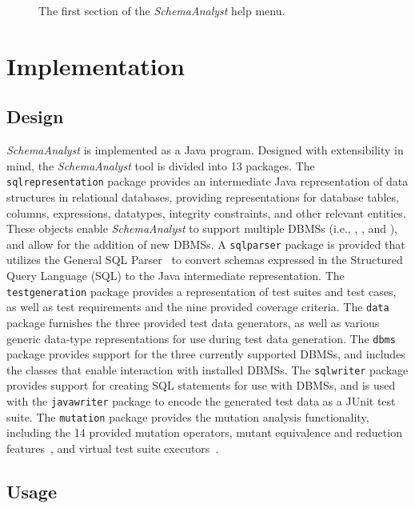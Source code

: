 \begin{figure}

\caption{\label{fig:usage} The first section of the \textit{SchemaAnalyst} help menu.}
\end{figure}

\section{Implementation}\label{sec:implementation}
\subsection{Design}


\textit{SchemaAnalyst} is implemented as a Java program.  Designed with extensibility in mind, the
\textit{SchemaAnalyst} tool is divided into 13 packages. The \texttt{sqlrepresentation} package provides an intermediate
Java representation of data structures in relational databases, providing representations for database tables, columns,
expressions, datatypes, integrity constraints, and other relevant entities. These objects enable \textit{SchemaAnalyst}
to support multiple DBMSs (i.e., \sqlite, \postgres, and \hypersql), and allow for the addition of new DBMSs. A
\texttt{sqlparser} package is provided that utilizes the General SQL Parser~\cite{} to convert schemas expressed in the
Structured Query Language (SQL) to the Java intermediate representation. The \texttt{testgeneration} package provides a
representation of test suites and test cases, as well as test requirements and the nine provided coverage criteria. The
\texttt{data} package furnishes the three provided test data generators, as well as various generic data-type
representations for use during test data generation. The \texttt{dbms} package provides support for the three currently
supported DBMSs, and includes the classes that enable interaction with installed DBMSs. The \texttt{sqlwriter} package
provides support for creating SQL statements for use with DBMSs, and is used with the \texttt{javawriter} package to
encode the generated test data as a JUnit test suite. The \texttt{mutation} package provides the mutation analysis
functionality, including the 14 provided mutation operators, mutant equivalence and reduction
features~\cite{wright2014impact}, and virtual test suite executors~\cite{mcminn2016virtual}.

\subsection{Usage}

